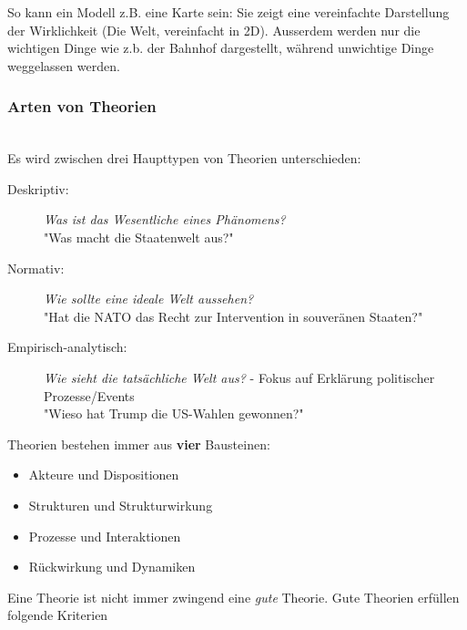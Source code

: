 \documentclass[a4paper, 11pt]{article}
\begin{document}
So kann ein Modell z.B. eine Karte sein: Sie zeigt eine vereinfachte Darstellung der Wirklichkeit (Die Welt, vereinfacht in 2D). Ausserdem werden nur die wichtigen Dinge wie z.b. der Bahnhof dargestellt, während unwichtige Dinge weggelassen werden. 

\subsubsection{Arten von Theorien} \mbox{} \\
Es wird zwischen drei Haupttypen von Theorien unterschieden: 

\begin{description}
	\item[Deskriptiv: ] \textit{Was ist das Wesentliche eines Phänomens?} \\
	"Was macht die Staatenwelt aus?"
	\item[Normativ: ] \textit{Wie sollte eine ideale Welt aussehen?} \\
	"Hat die NATO das Recht zur Intervention in souveränen Staaten?"
	\item[Empirisch-analytisch: ] \textit{Wie sieht die tatsächliche Welt aus?} - Fokus auf Erklärung politischer Prozesse/Events \\
	"Wieso hat Trump die US-Wahlen gewonnen?"
\end{description}

\vspace{10px}

Theorien bestehen immer aus \textbf{vier} Bausteinen: 

\begin{itemize}
	\item Akteure und Dispositionen
	\item Strukturen und Strukturwirkung
	\item Prozesse und Interaktionen
	\item Rückwirkung und Dynamiken
\end{itemize}


\vspace{10px}

\noindent Eine Theorie ist nicht immer zwingend eine \textit{gute} Theorie. Gute Theorien erfüllen folgende Kriterien
\end{document}

